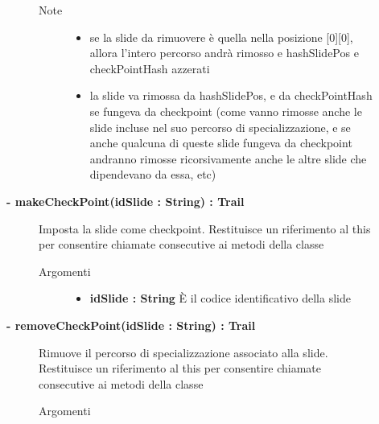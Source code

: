 \begin{description}
\begin{description}
\begin{description}
\begin{itemize}
				\end{itemize}
			\item[Note] \hfill	
				\begin{itemize}
					\item se la slide da rimuovere è quella nella posizione [0][0], allora l'intero percorso andrà rimosso e hashSlidePos e checkPointHash azzerati
					\item la slide va rimossa da hashSlidePos, e da checkPointHash se fungeva da checkpoint (come vanno rimosse anche le slide incluse nel suo percorso di specializzazione, e se anche qualcuna di queste slide fungeva da checkpoint andranno rimosse ricorsivamente anche le altre slide che dipendevano da essa, etc)
				\end{itemize}
		\end{description}
	\end{description}
	
	\begin{description}
		\item[\textbf{\color{blue}- makeCheckPoint(idSlide : String) : Trail			}] \hfill
			Imposta la slide come checkpoint. Restituisce un riferimento al this per consentire chiamate consecutive ai metodi della classe
			
		\begin{description}
			\item[Argomenti] \hfill
				\begin{itemize}
				
					\item \textbf{idSlide : String		} \hfill
					È il codice identificativo della slide 
					
				\end{itemize}
			
		\end{description}
	\end{description}
	
	\begin{description}
		\item[\textbf{\color{blue}- removeCheckPoint(idSlide : String) : Trail			}] \hfill
			Rimuove il percorso di specializzazione associato alla slide. Restituisce un riferimento al this per consentire chiamate consecutive ai metodi della classe
			
		\begin{description}
			\item[Argomenti] \hfill
				\begin{itemize}
				

\end{itemize}
\end{description}
\end{description}
\end{description}
